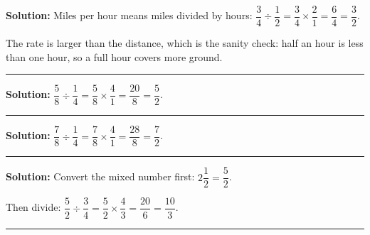 \documentclass[12pt]{article}
\begin{document}




\textbf{Solution:} Miles per hour means miles divided by hours: $\dfrac{3}{4} \div \dfrac{1}{2} = \dfrac{3}{4} \times \dfrac{2}{1} = \dfrac{6}{4} = \dfrac{3}{2}$. 

The rate is larger than the distance, which is the sanity check: half an hour is less than one hour, so a full hour covers more ground.

\vspace{0.15cm}\noindent\rule{\linewidth}{0.2pt}\vspace{0.15cm}


\textbf{Solution:} $\dfrac{5}{8} \div \dfrac{1}{4} = \dfrac{5}{8} \times \dfrac{4}{1} = \dfrac{20}{8} = \dfrac{5}{2}$. 

\vspace{0.15cm}\noindent\rule{\linewidth}{0.2pt}\vspace{0.15cm}


\textbf{Solution:} $\dfrac{7}{8} \div \dfrac{1}{4} = \dfrac{7}{8} \times \dfrac{4}{1} = \dfrac{28}{8} = \dfrac{7}{2}$. 

\vspace{0.15cm}\noindent\rule{\linewidth}{0.2pt}\vspace{0.15cm}


\textbf{Solution:} Convert the mixed number first: $2\dfrac{1}{2} = \dfrac{5}{2}$.

Then divide: $\dfrac{5}{2} \div \dfrac{3}{4} = \dfrac{5}{2} \times \dfrac{4}{3} = \dfrac{20}{6} = \dfrac{10}{3}$. 

\vspace{0.15cm}\noindent\rule{\linewidth}{0.2pt}\vspace{0.15cm}
\end{document}
